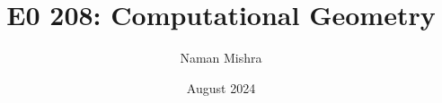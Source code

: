 \documentclass[12pt]{report}
\title{E0 208: Computational Geometry}
\author{Naman Mishra}
\date{August 2024}
\begin{document}
\maketitle
\tableofcontents
\listoflecture
    
    
    
    
    
    
    
    
\end{document}
